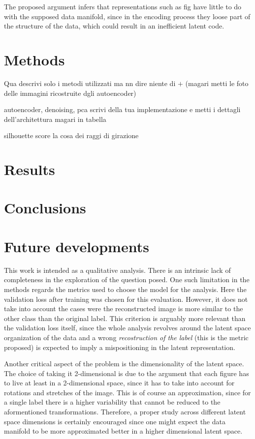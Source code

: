 \documentclass[twocolumn,gsifonts,twoside]{gsipaper}
\begin{document}
The proposed argument infers that representations such as fig %
have little to do with the supposed data manifold, since in the encoding process they loose part of the structure of the data, which could result in an inefficient latent code.



\section{Methods}
Qua descrivi solo i metodi utilizzati ma nn dire niente di $+$
(magari metti le foto delle immagini ricostruite dgli autoencoder)

autoencoder, denoising, pca
scrivi della tua implementazione e metti i dettagli dell'architettura magari in tabella

silhouette score
la cosa dei raggi di girazione


\section{Results}


\section{Conclusions}


\section{Future developments}
This work is intended as a qualitative analysis. There is an intrinsic lack of completeness in the exploration of the question posed. One such limitation in the methods regards the metrics used to choose the model for the analysis. Here the validation loss after training was chosen for this evaluation. However, it does not take into account the cases were the reconstructed image is more similar to the other class than the original label. This criterion is arguably more relevant than the validation loss itself, since the whole analysis revolves around the latent space organization of the data and a wrong \emph{recostruction of the label} (this is the metric proposed) is expected to imply a mispositioning in the latent representation.

Another critical aspect of the problem is the dimensionality of the latent space. The choice of taking it 2-dimensional is due to the argument that each figure has to live at least in a 2-dimensional space, since it has to take into account for rotations and stretches of the image. This is of course an approximation, since for a single label there is a higher variability that cannot be reduced to the aformentioned transformations. Therefore, a proper study across different latent space dimensions is certainly encouraged since one might expect the data manifold to be more approximated better in a higher dimensional latent space.
\end{document}
